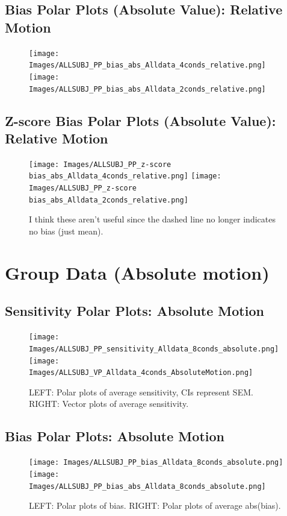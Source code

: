 \documentclass[11pt]{article} %
\begin{document}
\subsection{Bias Polar Plots (Absolute Value): Relative Motion}
\begin{figure}[H]
\centering %
\texttt{[image: Images/ALLSUBJ\_PP\_bias\_abs\_Alldata\_4conds\_relative.png]}
\texttt{[image: Images/ALLSUBJ\_PP\_bias\_abs\_Alldata\_2conds\_relative.png]}
\end{figure}
\subsection{Z-score Bias Polar Plots (Absolute Value): Relative Motion}
\begin{figure}[H]
\centering %
\texttt{[image: Images/ALLSUBJ\_PP\_z-score bias\_abs\_Alldata\_4conds\_relative.png]}
\texttt{[image: Images/ALLSUBJ\_PP\_z-score bias\_abs\_Alldata\_2conds\_relative.png]}
\caption{I think these aren't useful since the dashed line no longer indicates no bias (just mean).}
\end{figure}

\newpage
\section{Group Data (Absolute motion)}
\subsection{Sensitivity Polar Plots: Absolute Motion}
\begin{figure}[H]
\centering %
\texttt{[image: Images/ALLSUBJ\_PP\_sensitivity\_Alldata\_8conds\_absolute.png]}
\texttt{[image: Images/ALLSUBJ\_VP\_Alldata\_4conds\_AbsoluteMotion.png]}
\caption{LEFT: Polar plots of average sensitivity, CIs represent SEM. RIGHT: Vector plots of average sensitivity.}
\end{figure}
\subsection{Bias Polar Plots: Absolute Motion}
\begin{figure}[H]
\centering %
\texttt{[image: Images/ALLSUBJ\_PP\_bias\_Alldata\_8conds\_absolute.png]}
\texttt{[image: Images/ALLSUBJ\_PP\_bias\_abs\_Alldata\_8conds\_absolute.png]}
\caption{LEFT: Polar plots of bias. RIGHT: Polar plots of average abs(bias).}
\end{figure}
\end{document}
